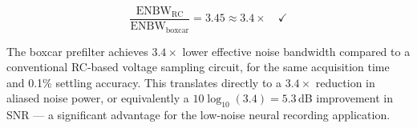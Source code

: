 \documentclass{article}
\begin{document}
\begin{equation}
    \boxed{\frac{\text{ENBW}_\text{RC}}{\text{ENBW}_\text{boxcar}} = 3.45 \approx 3.4\times \quad\checkmark}
\end{equation}

The boxcar prefilter achieves $3.4\times$ lower effective noise bandwidth compared to a conventional RC-based voltage sampling circuit, for the same acquisition time and 0.1\% settling accuracy. This translates directly to a $3.4\times$ reduction in aliased noise power, or equivalently a $10\log_{10}(3.4) = 5.3$\,dB improvement in SNR --- a significant advantage for the low-noise neural recording application.
\end{document}
